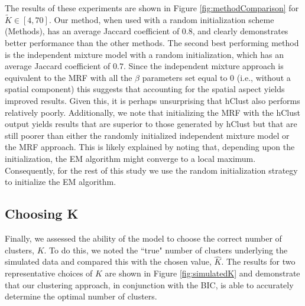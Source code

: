 	The results of these experiments are shown in Figure \ref{fig:methodComparison} for $\tilde{K} \in [4,70]$. Our method, when used with a random initialization scheme (Methods), has an average Jaccard coefficient of $0.8$, and clearly demonstrates better performance than the other methods. The second best performing method is the independent mixture model with a random initialization, which has an average Jaccard coefficient of $0.7$. Since the independent mixture approach is equivalent to the MRF with all the $\beta$ parameters set equal to 0 (i.e., without a spatial component) this suggests that accounting for the spatial aspect yields improved results. Given this, it is perhaps unsurprising that hClust also performs relatively poorly. Additionally, we note that initializing the MRF with the hClust output yields results that are superior to those generated by hClust but that are still poorer than either the randomly initialized independent mixture model or the MRF approach. This is likely explained by noting that, depending upon the initialization, the EM algorithm might converge to a local maximum. Consequently, for the rest of this study we use the random initialization strategy to initialize the EM algorithm. \\
	\subsection{Choosing K}
	
Finally, we assessed the ability of the model to choose the correct number of clusters, $K$. To do this, we noted the ``true" number of clusters underlying the simulated data and compared this with the chosen value, $\hat{K}$. The results for two representative choices of $K$ are shown in Figure \ref{fig:simulatedK} and demonstrate that our clustering approach, in conjunction with the BIC, is able to accurately determine the optimal number of clusters.\\

